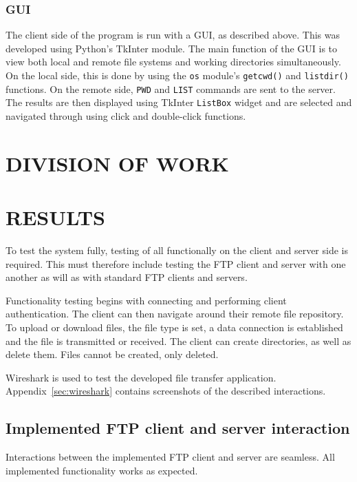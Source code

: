 \documentclass[10pt,twocolumn]{witseiepaper}
\begin{document}
\subsubsection*{GUI}
The client side of the program is run with a GUI, as described above. This was developed using Python's TkInter module. The main function of the GUI is to view both local and remote file systems and working directories simultaneously. On the local side, this is done by using the \texttt{os} module's \texttt{getcwd()} and \texttt{listdir()} functions. On the remote side, \texttt{PWD} and \texttt{LIST} commands are sent to the server. The results are then displayed using TkInter \texttt{ListBox} widget and are selected and navigated through using click and double-click functions.


\section{DIVISION OF WORK}

\section{RESULTS}\label{results}

To test the system fully, testing of all functionally on the client and server side is required. This must therefore include testing the FTP client and server with one another as will as with standard FTP clients and servers.

Functionality testing begins with connecting and performing client authentication. The client can then navigate around their remote file repository. To upload or download files, the file type is set, a data connection is established and the file is transmitted or received. The client can create directories, as well as delete them. Files cannot be created, only deleted.

Wireshark is used to test the developed file transfer application. Appendix~\ref{sec:wireshark} contains screenshots of the described interactions. 

\subsection{Implemented FTP client and server interaction}

Interactions between the implemented FTP client and server are seamless. All implemented functionality works as expected.
\end{document}

